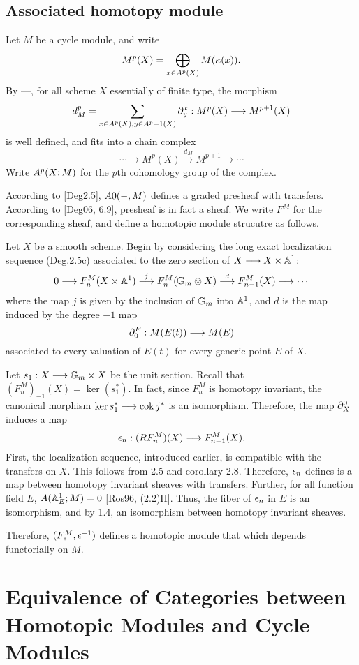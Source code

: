 \subsection{Associated homotopy module}\label{subsect_assoc_hm}

Let $M$ be a cycle module, and write 
\[
M^p(X) = \bigoplus_{x \in \subsch{p}{X}} M(\resf{x}).
\] 
By ---, for all scheme $X$ essentially of finite type, the 
morphism
\[
d_M^p = \sum_{x \in \subsch{p}{X}, y \in \subsch{p + 1}{X}} 
\ptres{x}{y} : M^p(X) \to M^{p + 1}(X)
\]
is well defined, and fits into a chain complex
\[
\cdots \to M^p(X) \stackrel{d_M}{\to} M^{p + 1} \to \cdots
\]
Write $\cmcohom^p(X; M)$ for the $p$th cohomology group of the 
complex.

According to [Deg2.5], $\cmcohom{0}(-,M)$ defines a graded 
presheaf with transfers. According to [Deg06, 6.9], presheaf is 
in fact a sheaf. We write $F^M$ for the corresponding sheaf, and 
define a homotopic module strucutre as follows.

Let $X$ be a smooth scheme. Begin by considering the long exact
localization sequence (Deg.2.5c) associated to the zero section of
$X \to X \times \A^1$:
\[
0 \to F^M_n(X \times \A^1) \stackrel{j}{\to} F^M_n(\Gmpt \otimes X) 
   \stackrel{d}{\to} F^M_{n - 1}(X) \to \cdots
\]
where the map $j$ is given by the inclusion of $\Gmpt$ into $\A^1$,
and $d$ is the map induced by the degree $-1$ map
\[
\ptres{E}{0}: M(E(t)) \to M(E)
\]
associated to every valuation of $E(t)$ for every generic point 
$E$ of $X$.

Let $s_1: X \to \Gmpt \times X$ be the unit section. Recall that
$(F^M_n)_{-1}(X) = \ker (s_1^*)$. In fact, since $F^M_n$ is 
homotopy invariant, the canonical morphism $\ker s_1^* \to
\cok j^*$ is an isomorphism. Therefore, the map $\ptres{0}{X}$ 
induces a map
\[
\loopCM_n : (RF^M_{n})(X) \to F^M_{n - 1}(X).
\]
First, the localization sequence, introduced earlier, is 
compatible with the transfers on $X$. This follows from 2.5 and 
corollary 2.8. Therefore, $\loopCM_n$ defines is a map between 
homotopy invariant sheaves with transfers. Further, for all 
function field $E$, $\cmcohom(\A^1_E; M) = 0$ [Ros96, (2.2)H]. 
Thus, the fiber of $\loopCM_n$ in $E$ is an isomorphism, and by 
1.4, an isomorphism between homotopy invariant sheaves.

Therefore, $(F^M_*, \loopCM^{-1})$ defines a homotopic module that
which depends functorially on $M$.

\section{Equivalence of Categories between Homotopic Modules and 
Cycle Modules}


